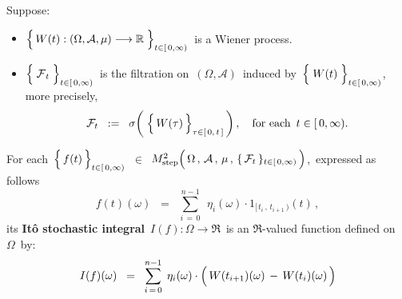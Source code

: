 \vskip 0.5cm
\begin{definition}
\mbox{}
\vskip 0.2cm
\noindent
Suppose:
\begin{itemize}
\item
	$\left\{\,\overset{{\color{white}.}}{W}(t) : (\Omega,\mathcal{A},\mu) \longrightarrow \Re \;\right\}_{t \in[\,0,\infty)}$\,
	is a Wiener process.
\item
	$\left\{\;\overset{{\color{white}.}}{\mathcal{F}}_{t}\;\right\}_{t\in[\,0,\infty)}$\,
	is the filtration on \,$(\Omega,\mathcal{A})$\, induced by
	\,$\left\{\;\overset{{\color{white}.}}{W}(t)\;\right\}_{t\in[\,0,\infty)}$,\,
	more precisely,
	\begin{equation*}
	\mathcal{F}_{t}
	\;\; := \;\;
		\sigma\!\left(\;\left\{\,\overset{{\color{white}.}}{W}(\tau)\,\right\}_{\tau\in[\,0,\,t\,]}\,\right),
	\quad
	\textnormal{for each \,$t \in [\,0,\infty)$}.
	\end{equation*}
\end{itemize}
For each
\,$\left\{\,\overset{{\color{white}.}}{f}(t)\,\right\}_{t\in[\,0,\infty)}$\,
$\in$
\,$M^{2}_{\textnormal{step}}\!
	\left(\,
		\overset{{\color{white}.}}{\Omega} \,,\, \mathcal{A} \,,\, \mu \,,\, \{\,\mathcal{F}_{t}\,\}_{t \in [\,0,\infty)}
		\,\right)$,\,
expressed as follows
\begin{equation*}
f(t)(\omega)
\;\; = \;\;
	\overset{n-1}{\underset{i\,=\,0}{\sum}}\;\,
	\eta_{i}(\omega) \cdot 1_{[\,t_{i}\,,\,t_{i+1}\,)}(t)\,,
\end{equation*}
its \textbf{It\^{o} stochastic integral}
\,$I(f) : \Omega \longrightarrow \Re$\,
is an $\Re$-valued function defined on \,$\Omega$\, by:
\begin{equation*}
I(f)(\omega)
\;\; = \;\;
	\overset{n-1}{\underset{i\,=\,0}{\sum}}\;\,
	\eta_{i}(\omega) \cdot \left(\, W(t_{i+1})(\omega) \,\overset{{\color{white}.}}{-}\, W(t_{i})(\omega) \,\right)
\end{equation*}
\end{definition}


